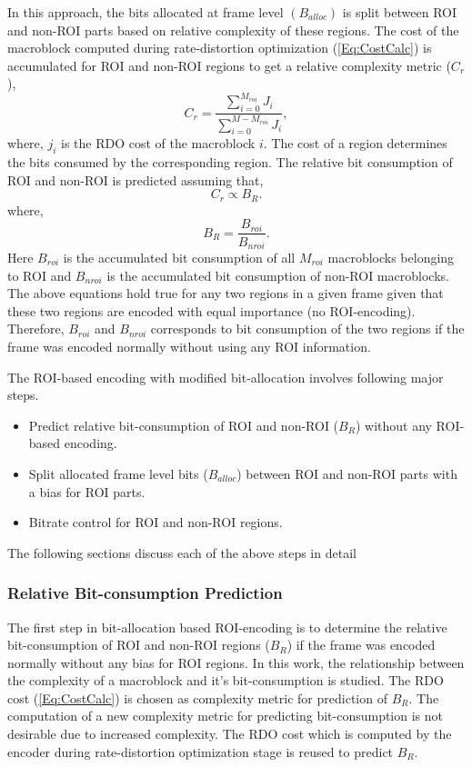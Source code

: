 \documentclass[11pt]{article} %
\begin{document}
In this approach, the bits allocated at frame level $(B_{alloc})$ is split between ROI and non-ROI parts based on relative complexity of these regions. The cost of the macroblock computed during rate-distortion optimization (\ref{Eq:CostCalc}) is accumulated for ROI and non-ROI regions to get a relative complexity metric ($C_r$),
$$C_r = \frac{\sum_{i =0}^{M_{roi}}{J_i}}{\sum_{i =0}^{M-M_{roi}}{J_i}},$$
where, $j_i$ is the RDO cost of the macroblock $i$. The cost of a region determines the bits consumed by the corresponding region. The relative bit consumption of ROI and non-ROI is predicted assuming that,
\begin{equation}
\label{Eq:Relative bit consumption}
	C_r \propto B_R.
\end{equation}
where, $$B_R = \frac{B_{roi}}{B_{nroi}}.$$
Here $B_{roi}$ is the accumulated bit consumption of all $M_{roi}$ macroblocks belonging to ROI and $B_{nroi}$ is the accumulated bit consumption of non-ROI macroblocks. The above equations hold true for any two regions in a given frame given that these two regions are encoded with equal importance (no ROI-encoding). Therefore, $B_{roi}$ and $B_{nroi}$ corresponds to bit consumption of the two regions if the frame was encoded normally without using any ROI information.
 
The ROI-based encoding with modified bit-allocation involves following major steps.
\begin{itemize}
	\item Predict relative bit-consumption of ROI and non-ROI ($B_R$) without any ROI-based encoding.
	\item Split allocated frame level bits ($B_{alloc}$) between ROI and non-ROI parts with a bias for ROI parts.
	\item Bitrate control for ROI and non-ROI regions.
\end{itemize}
The following sections discuss each of the above steps in detail

\subsubsection{Relative Bit-consumption Prediction} \label{sec:Relative Bit-consumption Prediction}
The first step in bit-allocation based ROI-encoding is to determine the relative bit-consumption of ROI and non-ROI regions ($B_R$) if the frame was encoded normally without any bias for ROI regions. In this work, the relationship between the complexity of a macroblock and it's bit-consumption is studied. The RDO cost (\ref{Eq:CostCalc}) is chosen as complexity metric for prediction of $B_R$. The computation of a new complexity metric for predicting bit-consumption is not desirable due to increased complexity. The RDO cost which is computed by the encoder during rate-distortion optimization stage is reused to predict $B_R$. 
\end{document}
